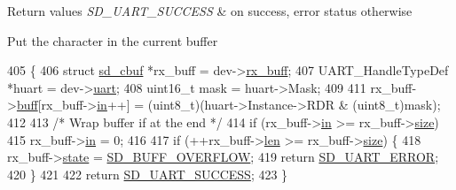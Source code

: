 \begin{DoxyRetVals}{Return values}
{\em S\+D\+\_\+\+U\+A\+R\+T\+\_\+\+S\+U\+C\+C\+E\+SS} & on success, error status otherwise \\
\hline
\end{DoxyRetVals}
Put the character in the current buffer 
\begin{DoxyCode}
405 \{
406     \textcolor{keyword}{struct }\mbox{\hyperlink{structsd__cbuf}{sd\_cbuf}} *rx\_buff = dev->\mbox{\hyperlink{structsd__uart__dev_a2bc17c33f4234299b83ba5d98edd5887}{rx\_buff}};
407     UART\_HandleTypeDef *huart = dev->\mbox{\hyperlink{structsd__uart__dev_a31b2a452cffe839ac4a3bf86eddc16b0}{uart}};
408     uint16\_t mask = huart->Mask;
409 
411     rx\_buff->\mbox{\hyperlink{structsd__cbuf_a8b212742c92a124f2eb4a244acc19f7c}{buff}}[rx\_buff->\mbox{\hyperlink{structsd__cbuf_a86fd6c417fa43c58339f7cde29495419}{in}}++] = (uint8\_t)(huart->Instance->RDR & (uint8\_t)mask);
412     
413     \textcolor{comment}{/* Wrap buffer if at the end */}
414     \textcolor{keywordflow}{if} (rx\_buff->\mbox{\hyperlink{structsd__cbuf_a86fd6c417fa43c58339f7cde29495419}{in}} >= rx\_buff->\mbox{\hyperlink{structsd__cbuf_ab2c6b258f02add8fdf4cfc7c371dd772}{size}})
415         rx\_buff->\mbox{\hyperlink{structsd__cbuf_a86fd6c417fa43c58339f7cde29495419}{in}} = 0;
416 
417     \textcolor{keywordflow}{if} (++rx\_buff->\mbox{\hyperlink{structsd__cbuf_a96bbf959016e4411c9e6b9812a8be60a}{len}} >= rx\_buff->\mbox{\hyperlink{structsd__cbuf_ab2c6b258f02add8fdf4cfc7c371dd772}{size}}) \{
418         rx\_buff->\mbox{\hyperlink{structsd__cbuf_aa88ff4ca3b7aaba9e9aaa27fd9ea94a9}{state}} = \mbox{\hyperlink{group___s_d___buffer___types_gga52f14e9c7b7d9ba092e1cd615559012ba0b2df962b7d70e883bd5faceda09f428}{SD\_BUFF\_OVERFLOW}};
419         \textcolor{keywordflow}{return} \mbox{\hyperlink{group___s_d___u_a_r_t___types_ggaff649a266fb34035c10733370c4fd104ad77d98472c0c3bb192d745b3389de08d}{SD\_UART\_ERROR}};
420     \}
421 
422     \textcolor{keywordflow}{return} \mbox{\hyperlink{group___s_d___u_a_r_t___types_ggaff649a266fb34035c10733370c4fd104a3b6fe085405a5d58c55226fd59f01994}{SD\_UART\_SUCCESS}};
423 \}
\end{DoxyCode}
